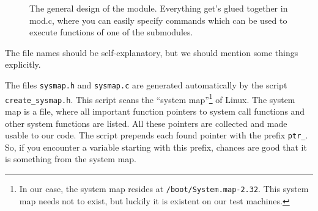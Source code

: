 \documentclass[10pt, letterpaper]{article}
\begin{document}
 \begin{figure}[ht]
  \centering
  
  \caption{The general design of the module. Everything get's glued together in mod.c, where you can easily specify commands which can be used to execute functions of one of the submodules.}
  \label{fig:hooking-system-call}
\end{figure}
The file names should be self-explanatory, but we should mention some things explicitly.

The files \texttt{sysmap.h} and \texttt{sysmap.c} are generated automatically by the script \linebreak \texttt{create\_sysmap.h}. This script scans the ``system map''\footnote{In our case, the system map resides at \texttt{/boot/System.map-2.32}. This system map needs not to exist, but luckily it is existent on our test machines.} of Linux. The system map is a file, where all important function pointers to system call functions and other system functions are listed. All these pointers are collected and made usable to our code. The script prepends each found pointer with the prefix \texttt{ptr\_}. So, if you encounter a variable starting with this prefix, chances are good that it is something from the system map.
\end{document}
